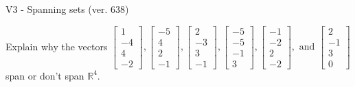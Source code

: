 \begin{exercise}
  \begin{exerciseTitle}V3 - Spanning sets (ver. 638)\end{exerciseTitle}
  \begin{exerciseStatement}
    Explain why the vectors \(\left[\begin{array}{r}
1 \\
-4 \\
4 \\
-2
\end{array}\right] , \left[\begin{array}{r}
-5 \\
4 \\
2 \\
-1
\end{array}\right] , \left[\begin{array}{r}
2 \\
-3 \\
3 \\
-1
\end{array}\right] , \left[\begin{array}{r}
-5 \\
-5 \\
-1 \\
3
\end{array}\right] , \left[\begin{array}{r}
-1 \\
-2 \\
2 \\
-2
\end{array}\right] , \text{ and } \left[\begin{array}{r}
2 \\
-1 \\
3 \\
0
\end{array}\right]\) span or don't span \(\mathbb{R}^4\). 
	



\end{exerciseStatement}
\end{exercise}
